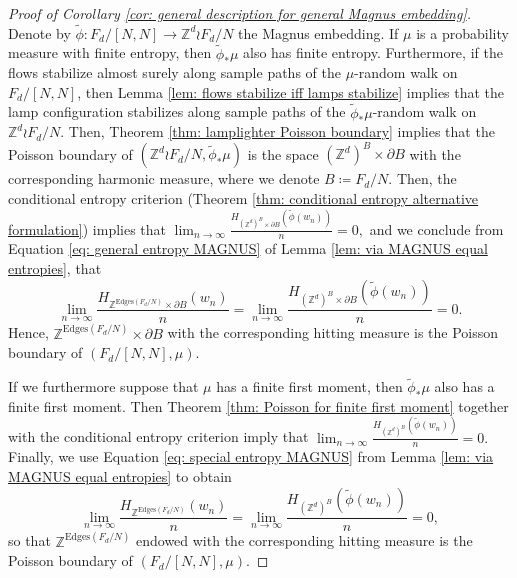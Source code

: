 \documentclass[reqno,oneside,11pt]{amsart}
\newcommand{\Z}{\mathbb{Z}}
\theoremstyle{plain}
\theoremstyle{definition}
\begin{document}
\begin{proof}[Proof of Corollary \ref{cor: general description for general Magnus embedding}]
 Denote by $\widetilde{\phi}:F_d/[N,N]\to \Z^d\wr F_d/N$ the Magnus embedding. If $\mu$ is a probability measure with finite entropy, then $\widetilde{\phi}_{*}\mu$ also has finite entropy. Furthermore, if the flows stabilize almost surely along sample paths of the $\mu$-random walk on $F_d/[N,N]$, then Lemma \ref{lem: flows stabilize iff lamps stabilize} implies that the lamp configuration stabilizes along sample paths of the $\widetilde{\phi}_{*}\mu$-random walk on $\Z^d\wr F_d/N$. Then, Theorem \ref{thm: lamplighter Poisson boundary} implies that the Poisson boundary of $(\Z^d\wr F_d/N, \widetilde{\phi}_{*}\mu)$ is the space $ (\Z^d)^B\times \partial B $ with the corresponding harmonic measure, where we denote $B\coloneqq F_d/N.$ Then, the conditional entropy criterion (Theorem \ref{thm: conditional entropy alternative formulation}) implies that $\lim_{n\to \infty} \frac{H_{(\Z^d)^B\times \partial B}\left(\widetilde{\phi}(w_n)\right)}{n}=0,$ and we conclude from Equation \eqref{eq: general entropy MAGNUS} of Lemma \ref{lem: via MAGNUS equal entropies}, that
\begin{equation*}
	\lim_{n\to \infty} \frac{H_{\Z^{\mathrm{Edges}(F_d/N)}\times \partial B}(w_n)}{n}=	\lim_{n\to \infty} \frac{H_{(\Z^d)^B\times \partial B}\left(\widetilde{\phi}(w_n)\right)}{n}=0.
\end{equation*}
Hence, $\Z^{\mathrm{Edges}(F_d/N)}\times \partial B$ with the corresponding hitting measure is the Poisson boundary of $(F_d/[N,N],\mu)$.
	
	If we furthermore suppose that $\mu$ has a finite first moment, then $\widetilde{\phi}_{*}\mu$ also has a finite first moment. Then Theorem \ref{thm: Poisson for finite first moment} together with the conditional entropy criterion imply that $\lim_{n\to \infty} \frac{H_{(\Z^d)^B}\left(\widetilde{\phi}(w_n)\right)}{n}=0.$ Finally, we use Equation \eqref{eq: special entropy MAGNUS} from Lemma \ref{lem: via MAGNUS equal entropies} to obtain
\begin{equation*}
	\lim_{n\to \infty} \frac{H_{\Z^{\mathrm{Edges}(F_d/N)}}(w_n)}{n}=	\lim_{n\to \infty} \frac{H_{(\Z^d)^B}\left(\widetilde{\phi}(w_n)\right)}{n}=0,
	\end{equation*}
	so that $\Z^{\mathrm{Edges}(F_d/N)}$ endowed with the corresponding hitting measure is the Poisson boundary of $(F_d/[N,N],\mu)$.
\end{proof}		
\end{document}
